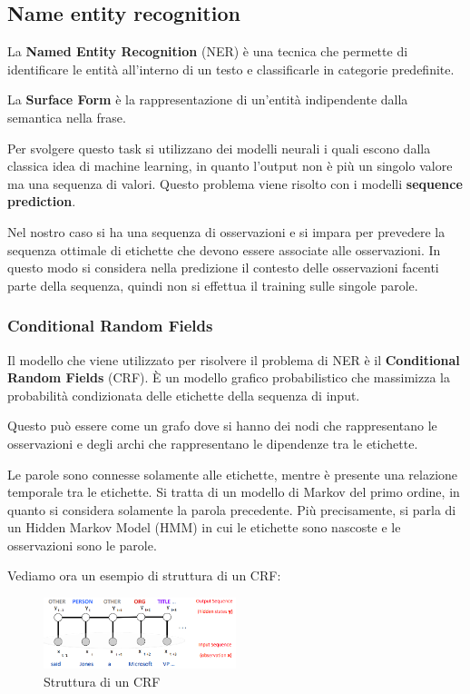 \subsection{Name entity recognition}
\begin{definizione}
      La \textbf{Named Entity Recognition} (NER) è una tecnica che permette di
      identificare le entità all'interno di un testo e classificarle in categorie
      predefinite.
\end{definizione}
\begin{definizione}
      La \textbf{Surface Form} è la rappresentazione di un'entità indipendente
      dalla semantica nella frase.
\end{definizione}
Per svolgere questo task si utilizzano dei modelli neurali i quali escono dalla
classica idea di machine learning, in quanto l'output non è più un singolo valore
ma una sequenza di valori. Questo problema viene risolto con i modelli \textbf{sequence
      prediction}.

Nel nostro caso si ha una sequenza di osservazioni e si impara per prevedere la
sequenza ottimale di etichette che devono essere associate alle osservazioni.
In questo modo si considera nella predizione il contesto delle osservazioni
facenti parte della sequenza, quindi non si effettua il training sulle singole parole.
\subsubsection{Conditional Random Fields}
Il modello che viene utilizzato per risolvere il problema di NER è il \textbf{Conditional
      Random Fields} (CRF). È un modello grafico probabilistico che
massimizza la probabilità condizionata delle etichette della sequenza di input.

Questo può essere come un grafo dove si hanno dei nodi che rappresentano
le osservazioni e degli archi che rappresentano le dipendenze tra le etichette.

Le parole sono connesse solamente alle etichette, mentre è presente una relazione
temporale tra le etichette. Si tratta di un modello di Markov del primo ordine,
in quanto si considera solamente la parola precedente. Più precisamente, si parla
di un Hidden Markov Model (HMM) in cui le etichette sono nascoste e le osservazioni
sono le parole.

Vediamo ora un esempio di struttura di un CRF:
\begin{figure}[!ht]
      \centering
      \includegraphics[width=0.5\textwidth]{./img/nlp/crf.png}
      \caption{Struttura di un CRF}
      \label{fig:crf}
\end{figure}

